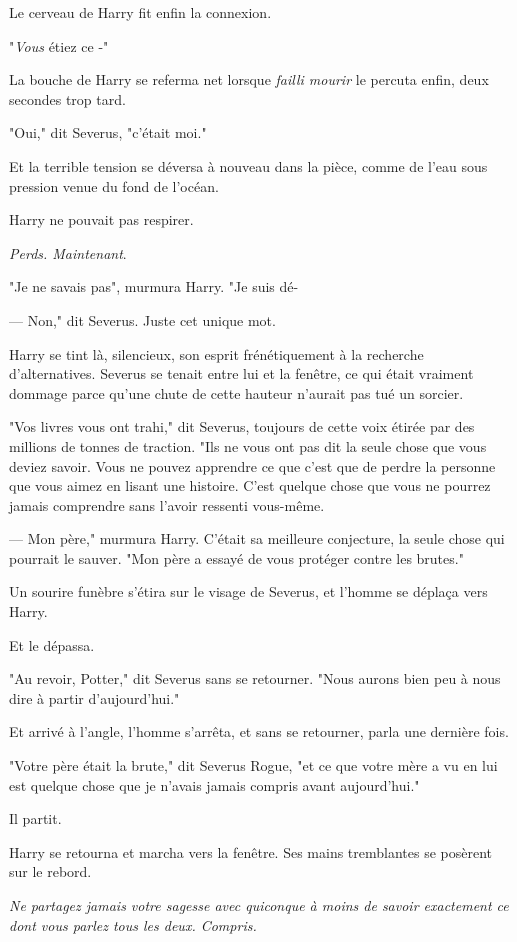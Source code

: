 Le cerveau de Harry fit enfin la connexion.

"\emph{Vous} étiez ce -"

La bouche de Harry se referma net lorsque \emph{failli mourir} le percuta enfin, deux secondes trop tard.

"Oui," dit Severus, "c'était moi."

Et la terrible tension se déversa à nouveau dans la pièce, comme de l'eau sous pression venue du fond de l'océan.

Harry ne pouvait pas respirer.

\emph{Perds. Maintenant}.

"Je ne savais pas", murmura Harry. "Je suis dé-

--- Non," dit Severus. Juste cet unique mot.

Harry se tint là, silencieux, son esprit frénétiquement à la recherche d'alternatives. Severus se tenait entre lui et la fenêtre, ce qui était vraiment dommage parce qu'une chute de cette hauteur n'aurait pas tué un sorcier.

"Vos livres vous ont trahi," dit Severus, toujours de cette voix étirée par des millions de tonnes de traction. "Ils ne vous ont pas dit la seule chose que vous deviez savoir. Vous ne pouvez apprendre ce que c'est que de perdre la personne que vous aimez en lisant une histoire. C'est quelque chose que vous ne pourrez jamais comprendre sans l'avoir ressenti vous-même.

--- Mon père," murmura Harry. C'était sa meilleure conjecture, la seule chose qui pourrait le sauver. "Mon père a essayé de vous protéger contre les brutes."

Un sourire funèbre s'étira sur le visage de Severus, et l'homme se déplaça vers Harry.

Et le dépassa.

"Au revoir, Potter," dit Severus sans se retourner. "Nous aurons bien peu à nous dire à partir d'aujourd'hui."

Et arrivé à l'angle, l'homme s'arrêta, et sans se retourner, parla une dernière fois.

"Votre père était la brute," dit Severus Rogue, "et ce que votre mère a vu en lui est quelque chose que je n'avais jamais compris avant aujourd'hui."

Il partit.

Harry se retourna et marcha vers la fenêtre. Ses mains tremblantes se posèrent sur le rebord.

\emph{Ne partagez jamais votre sagesse avec quiconque à moins de savoir exactement ce dont vous parlez tous les deux. Compris.}

